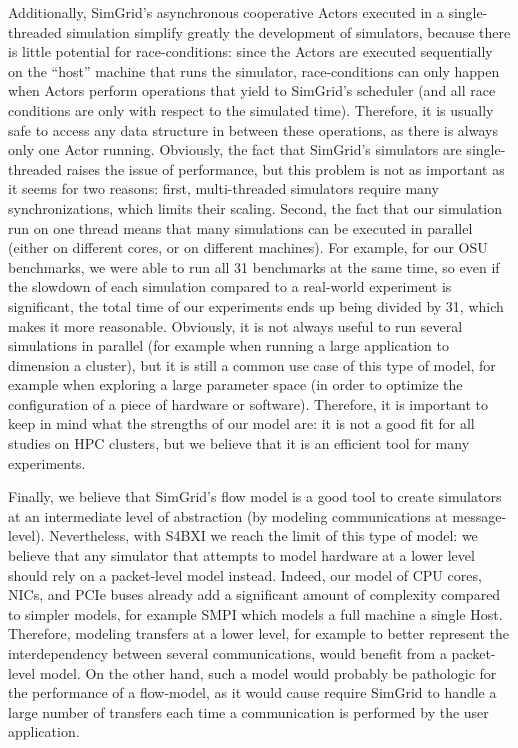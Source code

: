 Additionally, SimGrid's asynchronous cooperative Actors executed in a
single-threaded simulation simplify greatly the development of simulators,
because there is little potential for race-conditions: since the Actors are
executed sequentially on the ``host'' machine that runs the simulator,
race-conditions can only happen when Actors perform operations that yield to
SimGrid's scheduler (and all race conditions are only with respect to the
simulated time). Therefore, it is usually safe to access any data structure in
between these operations, as there is always only one Actor running. Obviously,
the fact that SimGrid's simulators are single-threaded raises the issue of
performance, but this problem is not as important as it seems for two reasons:
first, multi-threaded simulators require many synchronizations, which limits
their scaling. Second, the fact that our simulation run on one thread means that
many simulations can be executed in parallel (either on different cores, or on
different machines). For example, for our OSU benchmarks, we were able to run
all 31 benchmarks at the same time, so even if the slowdown of each simulation
compared to a real-world experiment is significant, the total time of our
experiments ends up being divided by 31, which makes it more reasonable.
Obviously, it is not always useful to run several simulations in parallel (for
example when running a large application to dimension a cluster), but it is
still a common use case of this type of model, for example when exploring a
large parameter space (in order to optimize the configuration of a piece of
hardware or software). Therefore, it is important to keep in mind what the
strengths of our model are: it is not a good fit for all studies on HPC
clusters, but we believe that it is an efficient tool for many experiments.

Finally, we believe that SimGrid's flow model is a good tool to create
simulators at an intermediate level of abstraction (by modeling communications
at message-level). Nevertheless, with S4BXI we reach the limit of this type of
model: we believe that any simulator that attempts to model hardware at a lower
level should rely on a packet-level model instead. Indeed, our model of CPU
cores, NICs, and PCIe buses already add a significant amount of complexity
compared to simpler models, for example SMPI which models a full machine a
single Host. Therefore, modeling transfers at a lower level, for example to
better represent the interdependency between several communications, would
benefit from a packet-level model. On the other hand, such a model would
probably be pathologic for the performance of a flow-model, as it would cause
require SimGrid to handle a large number of transfers each time a communication is
performed by the user application.

